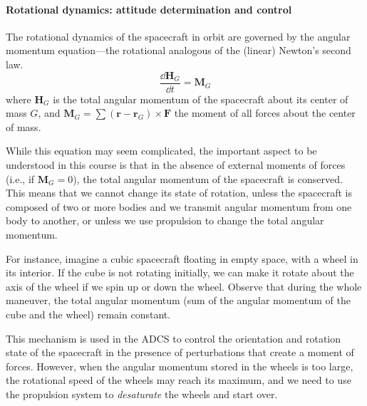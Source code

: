 \paragraph{Rotational dynamics: attitude determination and control}

The rotational dynamics of the spacecraft in orbit are governed by the angular 
momentum equation---the rotational analogous of the (linear) Newton's second 
law.
%
\begin{equation}
\frac{\dd \bm H_G}{\dd t} = \bm M_G
\end{equation}
%
where $\bm H_G$ is the total angular momentum of the spacecraft about its 
center of mass $G$, and $\bm M_G = \sum(\bm r - \bm r_G)\times \bm F$ the 
moment of all forces about the center of mass.

While this equation may seem complicated, the important aspect to be
understood in this course is that in the absence of external moments of forces
(i.e., if $\bm M_G = 0$), the total angular momentum of the spacecraft is
conserved. This means that we cannot change its state of rotation, unless the
spacecraft is composed of two or more bodies and we transmit angular momentum
from one body to another, or unless we use propulsion to change the total
angular momentum.

For instance, imagine a cubic spacecraft floating in empty space, with a wheel
in its interior. If the cube is not rotating initially, we can make it rotate
about the axis of the wheel if we spin up or down the wheel. Observe that
during the whole maneuver, the total angular momentum (sum of the angular
momentum of the cube and the wheel) remain constant.

This mechanism is used in the ADCS to control the orientation and rotation
state of the spacecraft in the presence of perturbations that create a moment
of forces. However, when the angular momentum stored in the wheels is too
large, the rotational speed of the wheels may reach its maximum, and we need
to use the propulsion system to \emph{desaturate} the wheels and start over.




